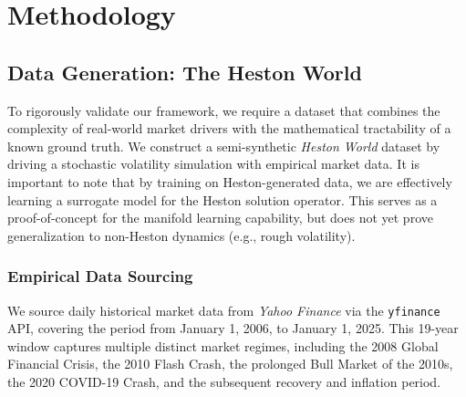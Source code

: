 \documentclass{article}
\begin{document}
\section{Methodology}

\subsection{Data Generation: The Heston World}
To rigorously validate our framework, we require a dataset that combines the complexity of real-world market drivers with the mathematical tractability of a known ground truth. We construct a semi-synthetic \emph{Heston World} dataset by driving a stochastic volatility simulation with empirical market data. It is important to note that by training on Heston-generated data, we are effectively learning a surrogate model for the Heston solution operator. This serves as a proof-of-concept for the manifold learning capability, but does not yet prove generalization to non-Heston dynamics (e.g., rough volatility).

\subsubsection{Empirical Data Sourcing}
We source daily historical market data from \emph{Yahoo Finance} via the \texttt{yfinance} API, covering the period from January 1, 2006, to January 1, 2025. This 19-year window captures multiple distinct market regimes, including the 2008 Global Financial Crisis, the 2010 Flash Crash, the prolonged Bull Market of the 2010s, the 2020 COVID-19 Crash, and the subsequent recovery and inflation period.
\end{document}
